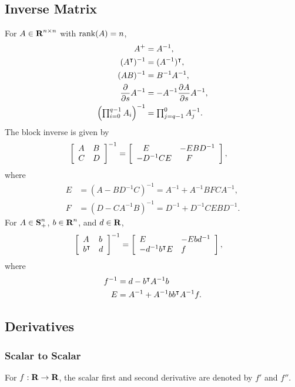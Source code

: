 \documentclass{article}
\begin{document}
\subsection{Inverse Matrix}
    For $A\in\textbf{R}^{n\times n}$ with $\text{rank}(A)=n$,
    \begin{align*}
        A^+&=A^{-1},\\
        (A^\intercal)^{-1}&=(A^{-1})^\intercal,\\
        (AB)^{-1}&=B^{-1}A^{-1},\\
        \frac{\partial }{\partial s}A^{-1}&=-A^{-1}\frac{\partial A}{\partial s}A^{-1},\\
        \left(\textstyle\prod_{i=0}^{q-1}A_i\right)^{-1}&=\textstyle\prod_{j=q-1}^{0}A_j^{-1}.
    \end{align*}
    The block inverse is given by
    \begin{align*}    
        \mat{A & B \\ C & D}^{-1}&=\mat{
            \minus E&-EBD^{-1}\\
            -D^{-1}CE&\minus F
            },
    \end{align*}
    where
    \begin{align*}
        E&=(A-BD^{-1}C)^{-1} =A^{-1}+A^{-1}BFCA^{-1},\\
        F&=(D-CA^{-1}B)^{-1} =D^{-1}+D^{-1}CEBD^{-1}.
    \end{align*}
    For $A\in\textbf{S}_+^n$, $b\in\textbf{R}^n$, and $d\in\textbf{R}$,
    \begin{align*}    
        \left[\begin{array}{lllllllllllllllllll}A & b \\ b^\intercal  & d\end{array}\right]^{-1}&=\left[\begin{array}{lllllllllllllllllll}
            E&-Ebd^{-1}\\
            -d^{-1}b^\intercal E&f
            \end{array}\right],
    \end{align*}
    where
    \begin{align*}
        f^{-1}&=d-b^\intercal A^{-1}b\\
        E&=A^{-1}+A^{-1}bb^\intercal A^{-1}f.
    \end{align*}

\clearpage

    \subsection{Derivatives}

    \subsubsection{Scalar to Scalar}
        For $f:\textbf{R}\to\textbf{R}$, the scalar first and second derivative 
        are denoted by $f'$ and $f''$.\\
    
\end{document}
